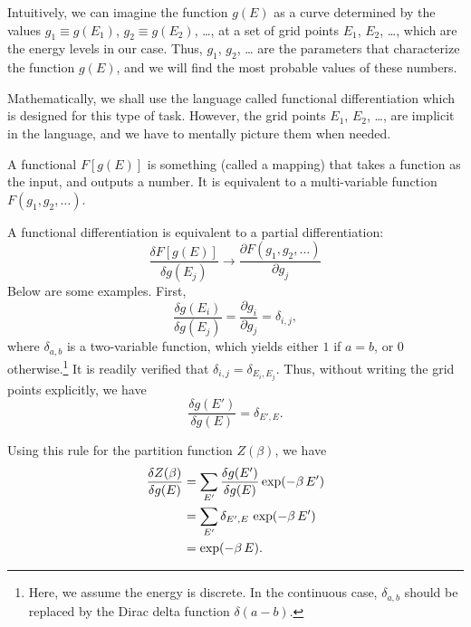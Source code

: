 \documentclass[aip,jcp,preprint,superscriptaddress]{revtex4-1}
\begin{document}
Intuitively,
we can imagine the function $g(E)$
as a curve determined by the values
$g_1 \equiv g(E_1)$,
$g_2 \equiv g(E_2)$,
\dots,
at a set of grid points
$E_1$, $E_2$, \dots,
which are the energy levels in our case.
%
Thus,
$g_1$, $g_2$, \dots
are the parameters that characterize the function $g(E)$,
and we will find the most probable values
of these numbers.



Mathematically,
we shall use the language called functional differentiation
which is designed for this type of task.
%
However, the grid points $E_1$, $E_2$, \dots,
are implicit in the language,
and we have to mentally picture them when needed.



A functional $F[g(E)]$ is something (called a mapping)
that takes a function as the input,
and outputs a number.
%
It is equivalent to a multi-variable function
$F(g_1, g_2, \dots)$.



A functional differentiation is
equivalent to a partial differentiation:
%
\begin{equation}
\frac{ \delta F[g(E)]}
     { \delta g(E_j) }
\rightarrow
\frac{ \partial F(g_1, g_2, \dots) }
     { \partial g_j }
\end{equation}
%
Below are some examples.
%
First,
%
\begin{equation}
\frac{ \delta g(E_i) }
     { \delta g(E_j) }
=
\frac{ \partial g_i }
     { \partial g_j }
=
\delta_{i, j},
\end{equation}
%
where $\delta_{a, b}$
is a two-variable function,
which yields either $1$ if $a = b$,
or $0$ otherwise.\footnote{
%
Here, we assume the energy is discrete.
In the continuous case,
$\delta_{a, b}$
should be replaced by the Dirac delta function
$\delta(a - b)$.
%
}
%
It is readily verified that
$\delta_{i, j} = \delta_{E_i, E_j}$.
%
Thus,
without writing the grid points explicitly, we have
\begin{equation}
\frac{ \delta g(E') }
     { \delta g(E) }
=
\delta_{E', E}.
\label{eq:funcdiff_g}
\end{equation}



Using this rule for the partition function $Z(\beta)$,
we have
\begin{align}
\frac{ \delta Z(\beta) }
     { \delta g(E) }
&=
\sum_{E'}
\frac{ \delta g(E') }
     { \delta g(E) }
\exp(-\beta \, E')
\notag \\
&=
\sum_{E'} \delta_{E', E} \, \exp(-\beta \, E')
\notag \\
&= \exp(-\beta \, E).
\label{eq:funcdiff_Z}
\end{align}
\end{document}
